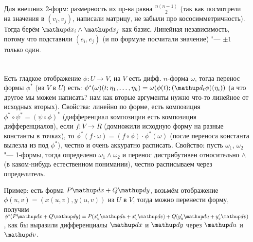 Для внешних 2-форм: размерность их пр-ва равна $\frac{n(n-1)}{2}$ (так как посмотрели на значения в $(v_i, v_j)$, написали матрицу, не забыли про кососимметричность).
Тогда берём $\d x_i \wedge \d x_j$ как базис.
Линейная независимость, потому что подставили $(e_i, e_j)$ (и по формуле посчитали значение) "--- $\pm 1$ только один.

\section{} %
Есть гладкое отображение $\phi \colon U \to V$, на $V$ есть дифф. $n$-форма $\omega$, тогда перенос формы $\phi^*$ (из $V$ в $U$) есть:
$\phi^*(\omega)(t;\eta_1, \dots, \eta_k)=\omega(\phi(t);(\d_t\phi)(\eta_i))$ (а что другое мы можем написать? нам как вторые аргументы нужно что-то линейное от исходных вторых).
Свойства: линейно по форме, есть композиция $\phi^* \circ \psi^* = (\psi \circ \phi)^*$ (дифференциал композиции есть композиция дифференциалов),
если $f \colon V \to R$ (домножили исходную форму на разные константы в точках), то $\phi^*(f \cdot \omega) = (f \circ \phi) \cdot \phi^*(\omega)$
(после переноса константа вылезла из под $\phi^*$), честно и очень аккуратно расписать.
Свойство: пусть $\omega_1$, $\omega_2$ "--- 1-формы, тогда определено $\omega_1 \wedge \omega_2$ и перенос дистрибутивен относительно $\wedge$ (в каком-нибудь
естественном понимании), честно расписываем через определитель.

Пример: есть форма $P\d x + Q\d y$, возьмём отображение $\phi(u, v) = (x(u, v), y(u, v))$ из $U$ в $V$, тогда можно перенести форму,
получим $\phi^*(P\d x + Q\d y) = P(x_u' \d u + x_v' \d v) + Q(y_u' \d u + y_v' \d v)$, как бы выразили дифференциалы $\d x$ и $\d y$
через $\d u$ и $\d v$.

\section{} %
\TODO

\section{} %
\TODO

\section{} %
\TODO

\section{} %
\TODO
